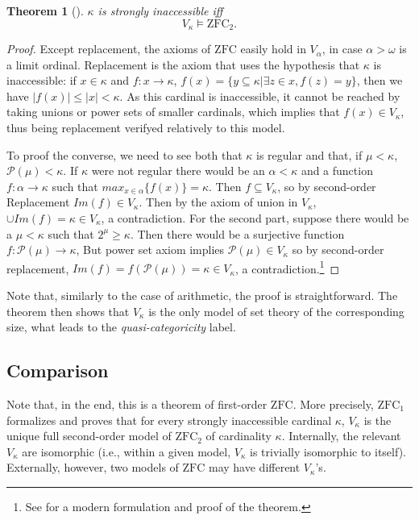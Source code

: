 \documentclass[11pt,a4paper]{article}
\theoremstyle{plain}
\newtheorem*{theorem*}{Theorem}
\begin{document}
\begin{theorem*}[\textcite{Zermelo1930}]
  
\(\kappa\) is strongly inaccessible iff
\[
V_\kappa \models \mathrm{ZFC}_2 .
\]

\end{theorem*}

\begin{proof}

Except replacement, the axioms of $\mathrm{ZFC}$ easily hold in \(V_\alpha\), in case \(\alpha > \omega\) is a limit ordinal. Replacement is the axiom that uses the hypothesis that $\kappa$ is inaccessible: if $x \in \kappa$ and $f: x \to \kappa$, $f(x)= \{ y \subseteq \kappa | \exists z \in x, f(z) = y \}$, then we have $|f(x)| \leq |x| < \kappa$. As this cardinal is inaccessible, it cannot be reached by taking unions or power sets of smaller cardinals, which implies that $f(x) \in V_\kappa$, thus being replacement verifyed relatively to this model.

To proof the converse, we need to see both that $\kappa$ is regular and that, if $\mu < \kappa$, $\mathcal{P}(\mu) < \kappa$. If $\kappa$ were not regular there would be an $\alpha < \kappa$ and a function $f : \alpha \to \kappa$ such that $max_{x\in\alpha}\{ f(x) \} = \kappa$. Then $f \subseteq V_\kappa$, so by second-order Replacement $Im(f) \in V_\kappa$. Then by the axiom of union in $V_\kappa$, $\cup Im(f) = \kappa \in V_\kappa$, a contradiction. For the second part, suppose there would be a \(\mu < \kappa\) such that $2^\mu \geq \kappa$. Then there would be a surjective function $f : \mathcal{P}(\mu)\to \kappa$, But power set axiom implies $\mathcal{P}(\mu) \in V_\kappa$ so by second-order replacement, $Im(f)= f(\mathcal{P}(\mu))=\kappa \in V_\kappa$, a contradiction.\footnote{See \textcite[23]{Kanamori2003} for a modern formulation and proof of the theorem.}

\end{proof}

Note that, similarly to the case of arithmetic, the proof is straightforward. The theorem then shows that $V_\kappa$ is the only model of set theory of the corresponding size, what leads to the \textit{quasi-categoricity} label. 

\subsection{Comparison}

Note that, in the end, this is a theorem of first-order $\mathrm{ZFC}$. More precisely, $\mathrm{ZFC}_1$ formalizes and proves that for every strongly inaccessible cardinal $\kappa$, $V_\kappa$ is the unique full second-order model of $\mathrm{ZFC}_2$ of cardinality $\kappa$. Internally, the relevant $V_\kappa$ are isomorphic (i.e., within a given model, $V_\kappa$ is trivially isomorphic to itself). Externally, however, two models of $\mathrm{ZFC}$ may have different $V_\kappa$'s.
\end{document}
